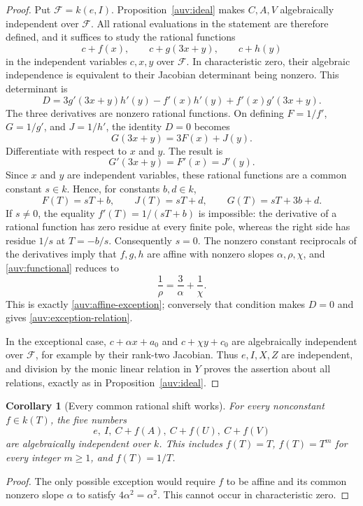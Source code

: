 \documentclass[11pt]{article}
\newtheorem{corollary}[theorem]{Corollary}
\theoremstyle{definition}
\theoremstyle{remark}
\begin{document}
\begin{proof}
Put $\mathcal F=k(e,I)$.  Proposition~\ref{auv:ideal} makes $C,A,V$
algebraically independent over $\mathcal F$.  All rational evaluations in the
statement are therefore defined, and it suffices to study the rational
functions
\[
 c+f(x),\qquad c+g(3x+y),\qquad c+h(y)
\]
in the independent variables $c,x,y$ over $\mathcal F$.  In characteristic
zero, their algebraic independence is equivalent to their Jacobian
determinant being nonzero.  This determinant is
\[
 D=3g'(3x+y)h'(y)-f'(x)h'(y)+f'(x)g'(3x+y).
\]
The three derivatives are nonzero rational functions.  On defining
$F=1/f'$, $G=1/g'$, and $J=1/h'$, the identity $D=0$ becomes
\begin{equation}\label{auv:functional}
 G(3x+y)=3F(x)+J(y).
\end{equation}
Differentiate with respect to $x$ and $y$.  The result is
\[
 G'(3x+y)=F'(x)=J'(y).
\]
Since $x$ and $y$ are independent variables, these rational functions
are a common constant $s\in k$.  Hence, for constants $b,d\in k$,
\[
 F(T)=sT+b,\qquad J(T)=sT+d,\qquad G(T)=sT+3b+d.
\]
If $s\ne0$, the equality $f'(T)=1/(sT+b)$ is impossible: the
derivative of a rational function has zero residue at every finite
pole, whereas the right side has residue $1/s$ at $T=-b/s$.
Consequently $s=0$.  The nonzero constant reciprocals of the
derivatives imply that $f,g,h$ are affine with nonzero slopes
$\alpha,\rho,\chi$, and \eqref{auv:functional} reduces to
\[
 \frac1\rho=\frac3\alpha+\frac1\chi.
\]
This is exactly \eqref{auv:affine-exception}; conversely that condition
makes $D=0$ and gives \eqref{auv:exception-relation}.

In the exceptional case, $c+\alpha x+a_0$ and
$c+\chi y+c_0$ are algebraically independent over $\mathcal F$, for example by
their rank-two Jacobian.  Thus $e,I,X,Z$ are independent, and division
by the monic linear relation in $Y$ proves the assertion about all
relations, exactly as in Proposition~\ref{auv:ideal}.
\end{proof}

\begin{corollary}[Every common rational shift works]\label{auv:common}
For every nonconstant $f\in k(T)$, the five numbers
\[
 e,\ I,\ C+f(A),\ C+f(U),\ C+f(V)
\]
are algebraically independent over $k$.  This includes $f(T)=T$,
$f(T)=T^m$ for every integer $m\ge1$, and $f(T)=1/T$.
\end{corollary}
\begin{proof}
The only possible exception would require $f$ to be affine and its
common nonzero slope $\alpha$ to satisfy $4\alpha^2=\alpha^2$.
This cannot occur in characteristic zero.
\end{proof}
\end{document}
